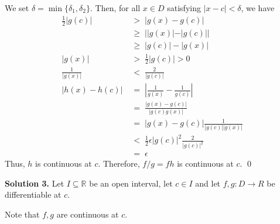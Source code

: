 \documentclass[10pt]{article}
\begin{document}
\begin{enumerate}
                We set $\delta = \min\{\delta_1, \delta_2\}$.
                Then, for all $x \in D$ satisfying $|x - c| < \delta$, we have
                \begin{align*}
                        \frac{1}{2}|g(c)| \;&>\; |g(x) - g(c)| \\
                                \;&\ge\; | |g(x)| - |g(c)| | \\
                                \;&\ge\; |g(c)| - |g(x)| \\
                        |g(x)| \;&>\; \frac{1}{2}|g(c)| > 0\\
                        \frac{1}{|g(x)|} \;&<\; \frac{2}{|g(c)|} \\
                        \left| h(x) - h(c) \right|
                                \;&=\; \left| \frac{1}{g(x)} - \frac{1}{g(c)} \right| \\
                                \;&=\; \frac{|g(x) - g(c)|}{|g(c)g(x)|} \\
                                \;&=\; |g(x) - g(c)| \frac{1}{|g(c)| |g(x)|} \\
                                \;&<\;  \frac{1}{2}\epsilon|g(c)|^2 \frac{2}{|g(c)|^2} \\
                                \;&=\; \epsilon
                \end{align*}
                Thus, $h$ is continuous at $c$.
                Therefore, $f /g = fh$ is continuous at $c$. \qed
        \end{enumerate}

        \textbf{Solution 3.}
        Let $I \subseteq \mathbb{R}$ be an open interval, let $c \in I$ and let $f, g\colon D \to R$ be differentiable at $c$.

        Note that $f, g$ are continuous at $c$.
\end{document}
